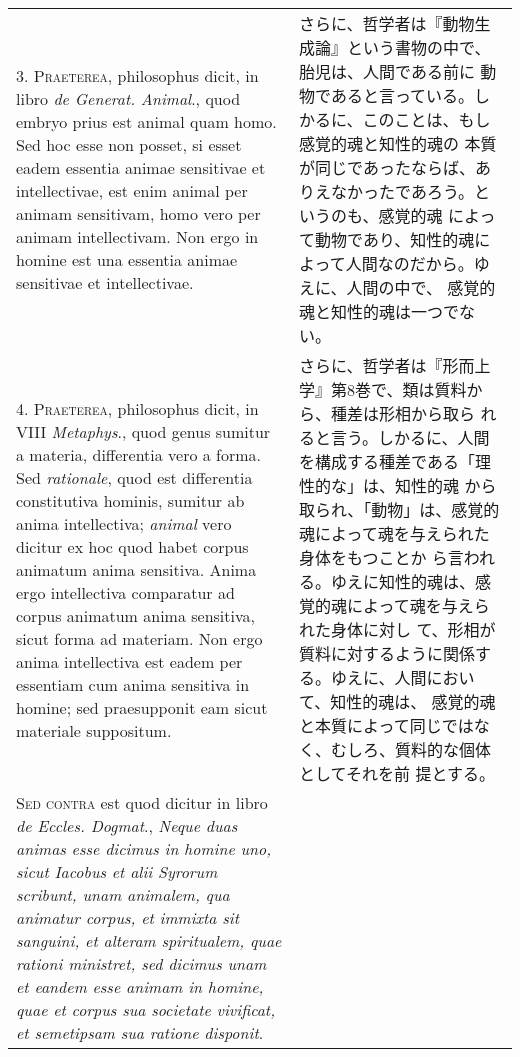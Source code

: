 \documentclass[paper=a4paper,fontsize=10pt,jafontsize=9pt,titlepage]{jlreq}
\begin{document}
\begin{longtable}{p{21em}p{21em}}
\\



3. {\scshape Praeterea}, philosophus dicit, in libro {\itshape de
Generat. Animal}., quod embryo prius est animal quam homo. Sed hoc
esse non posset, si esset eadem essentia animae sensitivae et
intellectivae, est enim animal per animam sensitivam, homo vero per
animam intellectivam. Non ergo in homine est una essentia animae
sensitivae et intellectivae.

&

さらに、哲学者は『動物生成論』という書物の中で、胎児は、人間である前に
動物であると言っている。しかるに、このことは、もし感覚的魂と知性的魂の
本質が同じであったならば、ありえなかったであろう。というのも、感覚的魂
によって動物であり、知性的魂によって人間なのだから。ゆえに、人間の中で、
感覚的魂と知性的魂は一つでない。
 
\\



4. {\scshape Praeterea}, philosophus dicit, in VIII {\itshape
Metaphys}., quod genus sumitur a materia, differentia vero a
forma. Sed {\itshape rationale}, quod est differentia constitutiva
hominis, sumitur ab anima intellectiva; {\itshape animal} vero dicitur
ex hoc quod habet corpus animatum anima sensitiva. Anima ergo
intellectiva comparatur ad corpus animatum anima sensitiva, sicut
forma ad materiam. Non ergo anima intellectiva est eadem per essentiam
cum anima sensitiva in homine; sed praesupponit eam sicut materiale
suppositum.

&

さらに、哲学者は『形而上学』第8巻で、類は質料から、種差は形相から取ら
れると言う。しかるに、人間を構成する種差である「理性的な」は、知性的魂
から取られ、「動物」は、感覚的魂によって魂を与えられた身体をもつことか
ら言われる。ゆえに知性的魂は、感覚的魂によって魂を与えられた身体に対し
て、形相が質料に対するように関係する。ゆえに、人間において、知性的魂は、
感覚的魂と本質によって同じではなく、むしろ、質料的な個体としてそれを前
提とする。
 
\\



{\scshape Sed contra} est quod dicitur in libro {\itshape de
Eccles. Dogmat}., {\itshape Neque duas animas esse dicimus in homine
uno, sicut Iacobus et alii Syrorum scribunt, unam animalem, qua
animatur corpus, et immixta sit sanguini, et alteram spiritualem, quae
rationi ministret, sed dicimus unam et eandem esse animam in homine,
quae et corpus sua societate vivificat, et semetipsam sua ratione
disponit}.


\end{longtable}
\end{document}

